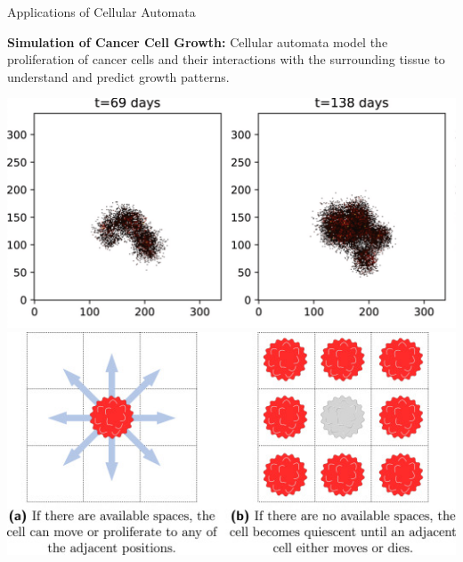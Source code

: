 \begin{frame}{Applications of Cellular Automata}
{        \textbf{Simulation of Cancer Cell Growth:} Cellular automata model the proliferation of cancer cells and their interactions with the surrounding tissue to understand and predict growth patterns.
        \vfill
        \begin{center}
            \includegraphics[scale=0.12]{lesson_4/images/ca_tumor.png}
            \includegraphics[scale=0.4]{lesson_4/images/ca_tumor_2.jpg}
        \end{center}
    }
\end{frame}
